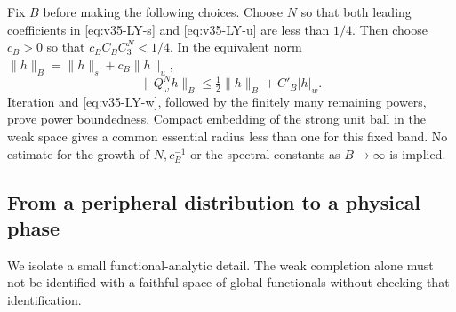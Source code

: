Fix $B$ before making the following choices. Choose $N$ so that both
leading coefficients in \eqref{eq:v35-LY-s} and
\eqref{eq:v35-LY-u} are less than $1/4$. Then choose $c_B>0$ so that
$c_B C_B C_3^N<1/4$. In the equivalent norm
$\|h\|_B=\|h\|_s+c_B\|h\|_u$,
\[
 \|Q_\omega^N h\|_B\le\tfrac12\|h\|_B+C'_B|h|_w.
\]
Iteration and \eqref{eq:v35-LY-w}, followed by the finitely many
remaining powers, prove power boundedness. Compact embedding of the
strong unit ball in the weak space gives a common essential radius
less than one for this fixed band. No estimate for the growth of
$N,c_B^{-1}$ or the spectral constants as $B\to\infty$ is implied.

\subsection{From a peripheral distribution to a physical phase}
We isolate a small functional-analytic detail. The weak completion
alone must not be identified with a faithful space of global
functionals without checking that identification.

